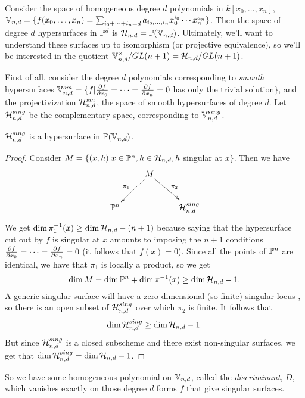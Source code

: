 
Consider the space of homogeneous degree $d$ polynomials in $k[x_0,\dots, x_n]$, $\mathbb{V}_{n,d}=\{f(x_0,\dots, x_n)=\sum_{i_0+\cdots+i_n=d} a_{i_0,\dots, i_n}x_0^{i_0}\cdots x_n^{a_n}\}$. Then the space of degree $d$ hypersurfaces in $\mathbb{P}^d$ is $\mathcal{H}_{n,d}=\mathbb{P}(\mathbb{V}_{n,d})$. Ultimately, we'll want to understand these surfaces up to isomorphism (or projective equivalence), so we'll be interested in the quotient $\mathbb{V}_{n,d}^\times/GL(n+1)=\mathcal{H}_{n,d}/GL(n+1)$.

First of all, consider the degree $d$ polynomials corresponding to \emph{smooth} hypersurfaces $\mathbb{V}_{n,d}^{sm}=\{f|\frac{\partial f}{\partial x_0}=\cdots =\frac{\partial f}{\partial x_n}=0$ has only the trivial solution$\}$, and the projectivization $\mathcal{H}_{n,d}^{sm}$, the space of smooth hypersurfaces of degree $d$. Let $\mathcal{H}_{n,d}^{sing}$ be the complementary space, corresponding to $\mathbb{V}_{n,d}^{sing}$. 

\begin{lemma}
 $\mathcal{H}_{n,d}^{sing}$ is a hypersurface in $\mathbb{P}(\mathbb{V}_{n,d})$.
\end{lemma}
\begin{proof}
 Consider $M=\{(x,h)|x\in \mathbb{P}^n, h\in \mathcal{H}_{n,d}, h$ singular at $x\}$. Then we have
 \[\xymatrix{
  & M\ar[dl]_{\pi_1}\ar[dr]^{\pi_2}\\
  \PP^n & & \H_{n,d}^{sing}
 }\]
 We get $\dim \pi_1^{-1}(x)\ge \dim \mathcal{H}_{n,d} - (n+1)$ because saying that the hypersurface cut out by $f$ is singular at $x$ amounts to imposing the $n+1$ conditions $\frac{\partial f}{\partial x_0}=\cdots=\frac{\partial f}{\partial x_n}=0$ (it follows that $f(x)=0$). Since all the points of $\mathbb{P}^n$ are identical, we have that $\pi_1$ is locally a product, so we get 
 \[
  \dim M= \dim \mathbb{P}^n+\dim \pi^{-1}(x)\ge \dim \mathcal{H}_{n,d} -1.
 \]
  A generic singular surface will have a zero-dimensional (so finite) singular locus , so there is an open subset of $\mathcal{H}_{n,d}^{sing}$ over which $\pi_2$ is finite. It follows that
 \[
  \dim \mathcal{H}_{n,d}^{sing} \ge \dim \mathcal{H}_{n,d}-1.
 \]
 But since $\mathcal{H}_{n,d}^{sing}$ is a closed subscheme and there exist non-singular surfaces, we get that $\dim \mathcal{H}_{n,d}^{sing}= \dim \mathcal{H}_{n,d}-1$.
\end{proof}
So we have some homogeneous polynomial on $\mathbb{V}_{n,d}$, called the \emph{discriminant}, $D$, which vanishes exactly on those degree $d$ forms $f$ that give singular surfaces. 

